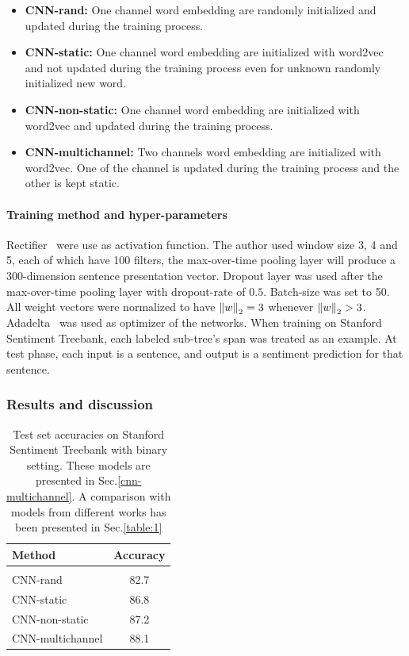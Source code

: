 \begin{itemize}
      \item \textbf{CNN-rand:} One channel word embedding are randomly initialized and updated during the training process.\label{cnn-rand}
    \item \textbf{CNN-static:} One channel word embedding are initialized with word2vec~\cite{word2vec} and not updated during the training process even for unknown randomly initialized new word.\label{cnn-static}
    \item \textbf{CNN-non-static:} One channel word embedding are initialized with word2vec and updated during the training process.\label{cnn-non-static}
    \item \textbf{CNN-multichannel:} Two channels word embedding are initialized with word2vec. One of the channel is updated during the training process and the other is kept static.\label{cnn-multichannel}
\end{itemize}
\paragraph{Training method and hyper-parameters}
Rectifier~\cite{rectifier} were use as activation function.
The author used window size 3, 4 and 5, each of which have 100 filters, the max-over-time pooling layer will produce a 300-dimension sentence presentation vector.
Dropout layer was used after the max-over-time pooling layer with dropout-rate of \(0.5\).
Batch-size was set to 50.
All weight vectors were normalized to have \(\left\lVert w \right\rVert_2 = 3\) whenever \(\left\lVert w \right\rVert_2 > 3\).
Adadelta~\cite{adadelta} was used as optimizer of the networks.
When training on Stanford Sentiment Treebank, each labeled sub-tree's span was treated as an example.
At test phase, each input is a sentence, and output is a sentiment prediction for that sentence.

\subsubsection{Results and discussion}\label{kimcnn-drawback}
\begin{table}[H]
\centering
\begin{tabular}{l c}
 \hline
 \hline
 Method & Accuracy \\ [0.5ex]
 \hline
 \hline
 \\
 CNN-rand & 82.7 \\
 CNN-static & 86.8 \\
 CNN-non-static & 87.2 \\
 CNN-multichannel & 88.1 \\
 \hline
 \hline
\end{tabular}
\caption[CNN test result]{Test set accuracies on Stanford Sentiment Treebank with binary setting. These models are presented in Sec.\ref{cnn-multichannel}.
A comparison with models from different works has been presented in Sec.\ref{table:1}}
\label{table:KimCNN}
\end{table}

